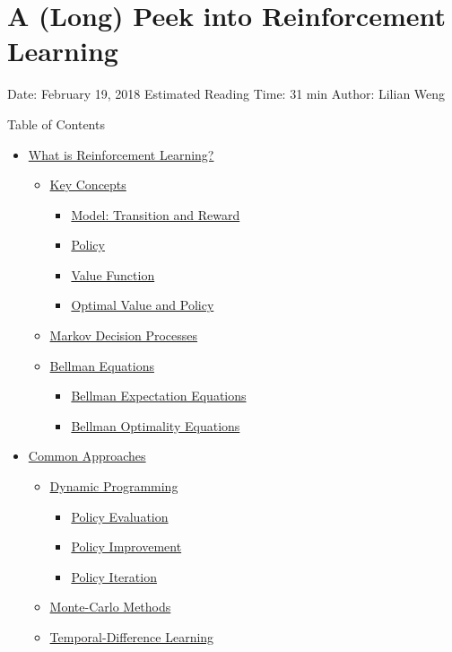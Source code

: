 \section{A (Long) Peek into Reinforcement Learning}\label{a-long-peek-into-reinforcement-learning}

Date: February 19, 2018 \textbar{} Estimated Reading Time: 31 min \textbar{} Author: Lilian Weng

{Table of Contents}

\begin{itemize}
\tightlist
\item
  \hyperref[what-is-reinforcement-learning]{What is Reinforcement Learning?}

  \begin{itemize}
  \tightlist
  \item
    \hyperref[key-concepts]{Key Concepts}

    \begin{itemize}
    \tightlist
    \item
      \hyperref[model-transition-and-reward]{Model: Transition and Reward}
    \item
      \hyperref[policy]{Policy}
    \item
      \hyperref[value-function]{Value Function}
    \item
      \hyperref[optimal-value-and-policy]{Optimal Value and Policy}
    \end{itemize}
  \item
    \hyperref[markov-decision-processes]{Markov Decision Processes}
  \item
    \hyperref[bellman-equations]{Bellman Equations}

    \begin{itemize}
    \tightlist
    \item
      \hyperref[bellman-expectation-equations]{Bellman Expectation Equations}
    \item
      \hyperref[bellman-optimality-equations]{Bellman Optimality Equations}
    \end{itemize}
  \end{itemize}
\item
  \hyperref[common-approaches]{Common Approaches}

  \begin{itemize}
  \tightlist
  \item
    \hyperref[dynamic-programming]{Dynamic Programming}

    \begin{itemize}
    \tightlist
    \item
      \hyperref[policy-evaluation]{Policy Evaluation}
    \item
      \hyperref[policy-improvement]{Policy Improvement}
    \item
      \hyperref[policy-iteration]{Policy Iteration}
    \end{itemize}
  \item
    \hyperref[monte-carlo-methods]{Monte-Carlo Methods}
  \item
    \hyperref[temporal-difference-learning]{Temporal-Difference Learning}


\end{itemize}
\end{itemize}
